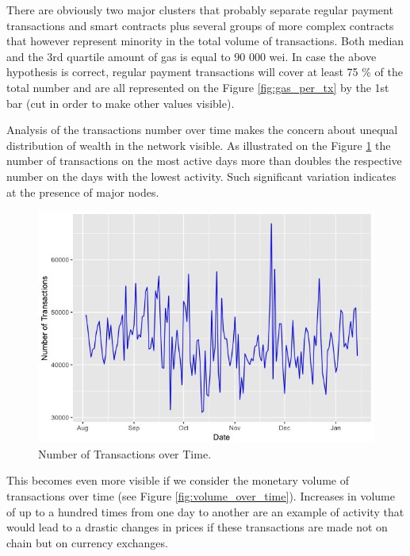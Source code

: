 There are obviously two major clusters that probably separate regular payment transactions and smart contracts plus several groups of more complex contracts that however represent minority in the total volume of transactions. 
Both median and the 3rd quartile amount of gas is equal to 90 000 wei. In case the above hypothesis is correct, regular payment transactions will cover at least 75 \% of the total number and are all represented on the Figure \ref{fig:gas_per_tx} by the 1st bar (cut in order to make other values visible).

Analysis of the transactions number over time makes the concern about unequal distribution of wealth in the network visible. 
As illustrated on the Figure \ref{fig:tx_over_time} the number of transactions on the most active days more than doubles the respective number on the days with the lowest activity. 
Such significant variation indicates at the presence of major nodes.  

\begin{figure}[h]
  \centering
  \includegraphics[width=\linewidth]{figures/tx_over_time.jpeg}
  \caption{Number of Transactions over Time.}
  \label{fig:tx_over_time}
\end{figure}

This becomes even more visible if we consider the monetary volume of transactions over time (see Figure \ref{fig:volume_over_time}).
Increases in volume of up to a hundred times from one day to another are an example of activity that would lead to a drastic changes in prices if these transactions are made not on chain but on currency exchanges.

